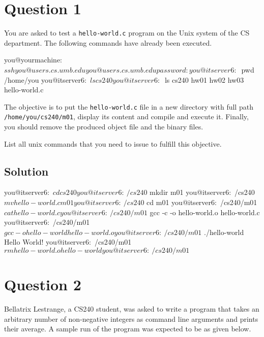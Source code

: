 \documentclass[12pt,letterpaper,twoside]{article}
\begin{document}


\section*{Question 1}

You are asked to test a \texttt{hello-world.c} program on the Unix system of the CS department.
The following commands have already been executed.

\begin{terminal}
you@yourmachine:~$ ssh you@users.cs.umb.edu
you@users.cs.umb.edu password:
you@itserver6:~$ pwd
/home/you
you@itserver6:~$ ls
cs240
you@itserver6:~$ ls cs240
hw01 hw02 hw03 hello-world.c
\end{terminal}

The objective is to put the \texttt{hello-world.c} file in a new directory with full path \texttt{/home/you/cs240/m01}, display its content and compile and execute it.
Finally, you should remove the produced object file and the binary files.

List all unix commands that you need to issue to fulfill this objective.

\subsection*{Solution}

\begin{terminal}
you@itserver6:~$ cd cs240
you@itserver6:~/cs240$ mkdir m01
you@itserver6:~/cs240$ mv hello-world.c m01
you@itserver6:~/cs240$ cd m01
you@itserver6:~/cs240/m01$ cat hello-world.c
you@itserver6:~/cs240/m01$ gcc -c -o hello-world.o hello-world.c
you@itserver6:~/cs240/m01$ gcc -o hello-world hello-world.o
you@itserver6:~/cs240/m01$ ./hello-world
Hello World!
you@itserver6:~/cs240/m01$ rm hello-world.o hello-world
you@itserver6:~/cs240/m01$
\end{terminal}

\section*{Question 2}

Bellatrix Lestrange, a CS240 student, was asked to write a program that takes an arbitrary number of non-negative integers as command line arguments and prints their average.
A sample run of the program was expected to be as given below.
\end{document}
